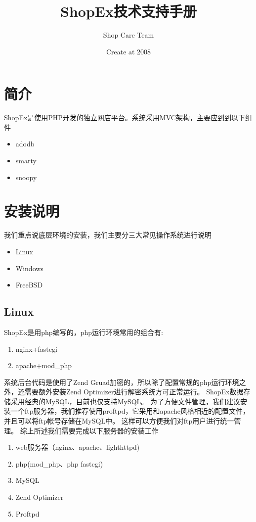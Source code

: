\documentclass{article}
\title{ShopEx技术支持手册}
\author{Shop Care Team}
\begin{document}
\date{Create at 2008}
\maketitle
\clearpage

\tableofcontents
\clearpage

\hypertarget{toc1}{}
\section{简介}
ShopEx是使用PHP开发的独立网店平台。系统采用MVC架构，主要应到到以下组件

\begin{itemize}
\item adodb
\item smarty
\item snoopy
\end{itemize}

\clearpage

\hypertarget{toc2}{}
\section{安装说明}
我们重点说底层环境的安装，我们主要分三大常见操作系统进行说明

\begin{itemize}
\item Linux
\item Windows
\item FreeBSD
\end{itemize}

\hypertarget{toc3}{}
\subsection{Linux}
ShopEx是用php编写的，php运行环境常用的组合有:

\begin{enumerate}
\item nginx+fastcgi
\item apache+mod\_php
\end{enumerate}

系统后台代码是使用了Zend
Gruad加密的，所以除了配置常规的php运行环境之外，还需要额外安装Zend Optimizer进行解密系统方可正常运行。
ShopEx数据存储采用经典的MySQL，目前也仅支持MySQL。
为了方便文件管理，我们建议安装一个ftp服务器，我们推荐使用proftpd，它采用和apache风格相近的配置文件，并且可以将ftp帐号存储在MySQL中。
这样可以方便我们对ftp用户进行统一管理。
综上所述我们需要完成以下服务器的安装工作

\begin{enumerate}
\item web服务器（nginx、apache、lighthttpd)
\item php(mod\_php、php fastcgi)
\item MySQL
\item Zend Optimizer
\item Proftpd
\end{enumerate}
\end{document}
